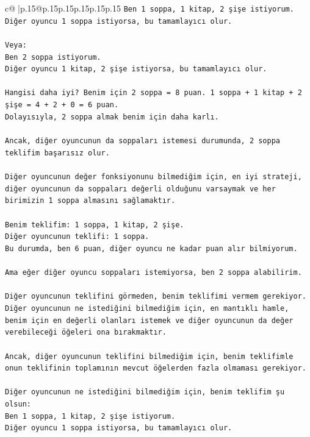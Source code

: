 \documentclass{article}
\begin{document}
{\begin{supertabular}{c@{$\;$}|p{.15\linewidth}@{}p{.15\linewidth}p{.15\linewidth}p{.15\linewidth}p{.15\linewidth}p{.15\linewidth}}
{{{\texttt{Ben 1 soppa, 1 kitap, 2 şişe istiyorum.} \\
\texttt{Diğer oyuncu 1 soppa istiyorsa, bu tamamlayıcı olur.} \\
\\ 
\texttt{Veya:} \\
\texttt{Ben 2 soppa istiyorum.} \\
\texttt{Diğer oyuncu 1 kitap, 2 şişe istiyorsa, bu tamamlayıcı olur.} \\
\\ 
\texttt{Hangisi daha iyi? Benim için 2 soppa = 8 puan. 1 soppa + 1 kitap + 2 şişe = 4 + 2 + 0 = 6 puan.} \\
\texttt{Dolayısıyla, 2 soppa almak benim için daha karlı.} \\
\\ 
\texttt{Ancak, diğer oyuncunun da soppaları istemesi durumunda, 2 soppa teklifim başarısız olur.} \\
\\ 
\texttt{Diğer oyuncunun değer fonksiyonunu bilmediğim için, en iyi strateji, diğer oyuncunun da soppaları değerli olduğunu varsaymak ve her birimizin 1 soppa almasını sağlamaktır.} \\
\\ 
\texttt{Benim teklifim: 1 soppa, 1 kitap, 2 şişe.} \\
\texttt{Diğer oyuncunun teklifi: 1 soppa.} \\
\texttt{Bu durumda, ben 6 puan, diğer oyuncu ne kadar puan alır bilmiyorum.} \\
\\ 
\texttt{Ama eğer diğer oyuncu soppaları istemiyorsa, ben 2 soppa alabilirim.} \\
\\ 
\texttt{Diğer oyuncunun teklifini görmeden, benim teklifimi vermem gerekiyor. Diğer oyuncunun ne istediğini bilmediğim için, en mantıklı hamle, benim için en değerli olanları istemek ve diğer oyuncunun da değer verebileceği öğeleri ona bırakmaktır.} \\
\\ 
\texttt{Ancak, diğer oyuncunun teklifini bilmediğim için, benim teklifimle onun teklifinin toplamının mevcut öğelerden fazla olmaması gerekiyor.} \\
\\ 
\texttt{Diğer oyuncunun ne istediğini bilmediğim için, benim teklifim şu olsun:} \\
\texttt{Ben 1 soppa, 1 kitap, 2 şişe istiyorum.} \\
\texttt{Diğer oyuncu 1 soppa istiyorsa, bu tamamlayıcı olur.} \\
}}}
\end{supertabular}}
\end{document}
